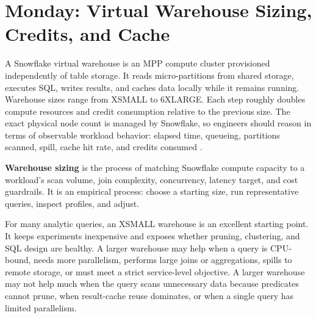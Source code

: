 \section{Monday: Virtual Warehouse Sizing, Credits, and Cache}
A Snowflake virtual warehouse is an MPP compute cluster provisioned independently of table storage. It reads micro-partitions from shared storage, executes SQL, writes results, and caches data locally while it remains running. Warehouse sizes range from XSMALL to 6XLARGE. Each step roughly doubles compute resources and credit consumption relative to the previous size. The exact physical node count is managed by Snowflake, so engineers should reason in terms of observable workload behavior: elapsed time, queueing, partitions scanned, spill, cache hit rate, and credits consumed \cite{snowflakeWarehouseOverviewDocs}.

\begin{definitionbox}
\textbf{Warehouse sizing} is the process of matching Snowflake compute capacity to a workload's scan volume, join complexity, concurrency, latency target, and cost guardrails. It is an empirical process: choose a starting size, run representative queries, inspect profiles, and adjust.
\end{definitionbox}

For many analytic queries, an XSMALL warehouse is an excellent starting point. It keeps experiments inexpensive and exposes whether pruning, clustering, and SQL design are healthy. A larger warehouse may help when a query is CPU-bound, needs more parallelism, performs large joins or aggregations, spills to remote storage, or must meet a strict service-level objective. A larger warehouse may not help much when the query scans unnecessary data because predicates cannot prune, when result-cache reuse dominates, or when a single query has limited parallelism.

